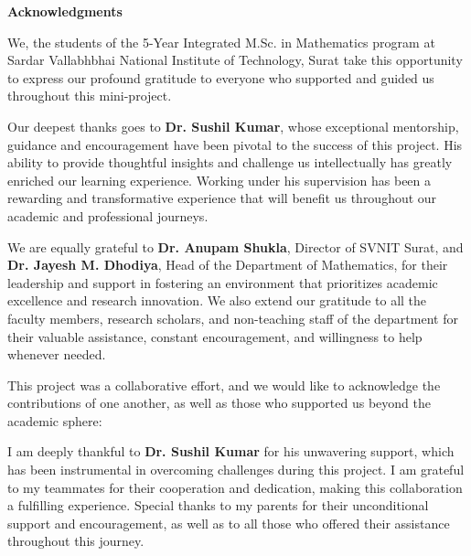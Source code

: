 \documentclass[12pt]{article}
\begin{document}
	
	\begin{center}
		{\color{blue} \Huge \textbf{Acknowledgments}}
	\end{center}
	
	\vspace{0.3cm}
	
	\justifying
	We, the students of the 5-Year Integrated M.Sc. in Mathematics program at Sardar Vallabhbhai National Institute of Technology, Surat take this opportunity to express our profound gratitude to everyone who supported and guided us throughout this mini-project.
	\vspace{0.2cm} 
	
	Our deepest thanks goes to \textbf{Dr. Sushil Kumar}, whose exceptional mentorship, guidance and encouragement have been pivotal to the success of this project. His ability to provide thoughtful insights and challenge us intellectually has greatly enriched our learning experience. Working under his supervision has been a rewarding and transformative experience that will benefit us throughout our academic and professional journeys.
	\vspace{0.2cm} 
	
	We are equally grateful to \textbf{Dr. Anupam Shukla}, Director of SVNIT Surat, and \textbf{Dr. Jayesh M. Dhodiya}, Head of the Department of Mathematics, for their leadership and support in fostering an environment that prioritizes academic excellence and research innovation. We also extend our gratitude to all the faculty members, research scholars, and non-teaching staff of the department for their valuable assistance, constant encouragement, and willingness to help whenever needed.
	\vspace{0.3cm} 
	
	This project was a collaborative effort, and we would like to acknowledge the contributions of one another, as well as those who supported us beyond the academic sphere:
	
	\vspace{0.3cm}
	
	I am deeply thankful to \textbf{Dr. Sushil Kumar} for his unwavering support, which has been instrumental in overcoming challenges during this project. I am grateful to my teammates for their cooperation and dedication, making this collaboration a fulfilling experience. Special thanks to my parents for their unconditional support and encouragement, as well as to all those who offered their assistance throughout this journey.
	
\end{document}
